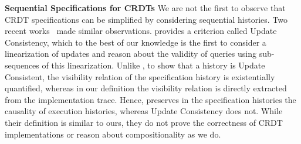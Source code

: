 \smallskip
\noindent
{\bf Sequential Specifications for CRDTs}
We are not the first to observe that CRDT specifications can be
simplified by considering sequential histories.
%
Two recent works~\cite{PerrinMJ14, JagadeesanR18} made similar
observations.
%
\citet{PerrinMJ14} provides a criterion called Update Consistency,
which to the best of our knowledge is the first to consider a
linearization of updates and reason about the validity of queries using sub-sequences
of this linearization.
%
Unlike \CRDTLinshort{}, to show that a history is Update Consistent,
the visibility relation of the specification history is existentially
quantified, whereas in our definition the visibility relation is
directly extracted from the implementation trace.
%
Hence, \CRDTLinshort{} preserves in the specification histories the
causality of execution histories, whereas Update Consistency does not.
%
While their definition is similar to ours, they do not prove the
correctness of CRDT implementations or reason about compositionality as we do.


